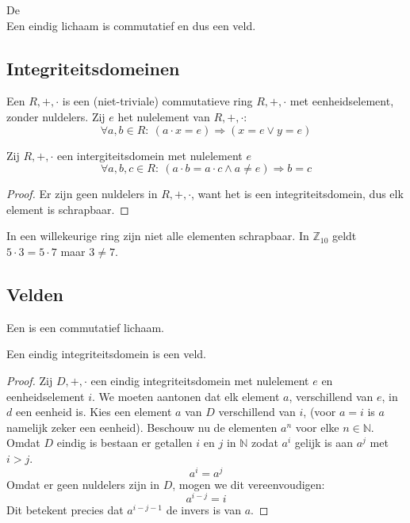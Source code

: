 \documentclass[main.tex]{subfiles}
\begin{document}
\begin{st}
  \label{st:stelling-van-wedderburn}
  De \\
  Een eindig lichaam is commutatief en dus een veld.
  \zb
\end{st}

\subsection{Integriteitsdomeinen}
\label{sec:integriteitsdomeinen}

\begin{de}
  \label{de:integriteitsdomein}
  Een  $R,+,\cdot$ is een (niet-triviale) commutatieve ring $R,+,\cdot$ met eenheidselement, zonder nuldelers.
  Zij $e$ het nulelement van $R,+,\cdot$:
  \[ \forall a, b \in R:\ (a \cdot x = e) \Rightarrow (x = e \vee y = e) \]
\end{de}

\begin{ei}
  Zij $R,+,\cdot$ een intergiteitsdomein met nulelement $e$
  \[ \forall a,b,c \in R:\ (a\cdot b = a\cdot c \wedge a \neq e) \Rightarrow b = c \]

  \begin{proof}
    Er zijn geen nuldelers in $R,+,\cdot$, want het is een integriteitsdomein, dus elk element is schrapbaar.
  \end{proof}
\end{ei}

\begin{opm}
  In een willekeurige ring zijn niet alle elementen schrapbaar.
  In $\mathbb{Z}_{10}$ geldt $5\cdot 3 = 5 \cdot 7$ maar $3 \neq 7$.
\end{opm}

\subsection{Velden}
\label{sec:velden}

\begin{de}
  \label{de:veld}
  Een  is een commutatief lichaam.
\end{de}

\begin{st}
  \label{st:eindig-integriteitsdomein-is-veld}
  Een eindig integriteitsdomein is een veld.

  \begin{proof}
    Zij $D,+,\cdot$ een eindig integriteitsdomein met nulelement $e$ en eenheidselement $i$.
    We moeten aantonen dat elk element $a$, verschillend van $e$, in $d$ een eenheid is.
    Kies een element $a$ van $D$ verschillend van $i$, (voor $a=i$ is $a$ namelijk zeker een eenheid).
    Beschouw nu de elementen $a^{n}$ voor elke $n\in \mathbb{N}$.
    Omdat $D$ eindig is bestaan er getallen $i$ en $j$ in $\mathbb{N}$ zodat $a^{i}$ gelijk is aan $a^{j}$ met $i > j$.
    \[ a^{i} = a^{j} \]
    Omdat er geen nuldelers zijn in $D$, mogen we dit vereenvoudigen:
    \[ a^{i-j} = i \]
    Dit betekent precies dat $a^{i-j-1}$ de invers is van $a$.
  \end{proof}
\end{st}
\end{document}
